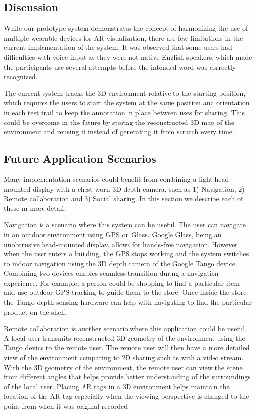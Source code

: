 \subsection{Discussion}

%
%
While our prototype  system demonstrates the concept of harmonizing the use of multiple wearable devices for AR visualization, there are few limitations in the current implementation of the system. It was observed that some users had difficulties with voice input as they were not native English speakers, which made the participants use several attempts before the intended word was correctly recognized.  

The current system tracks the 3D environment relative to the starting position, which requires the users to start the system at the same position and orientation in each test trail to keep the annotation in place between uses for sharing. This could be overcome in the future by storing the reconstructed 3D map of the environment and reusing it instead of generating it from scratch every time. 

\subsection{Future Application Scenarios}

Many implementation scenarios could benefit from combining a light head-mounted display with a chest worn 3D depth camera,  such as 1) Navigation, 2) Remote collaboration and 3) Social sharing. In this section we describe each of these in more detail.

Navigation is a scenario where this system can be useful. The user can navigate in an outdoor environment using GPS on Glass. Google Glass, being an unobtrusive head-mounted display, allows for hands-free navigation. However when the user enters a building, the GPS stops working and the system switches to indoor navigation using the 3D depth camera of the Google Tango device. Combining two devices enables seamless transition during a navigation experience. For example, a person could be shopping to find a particular item and use outdoor GPS tracking to guide them to the store. Once inside the store the Tango depth sensing hardware can help with navigating to find the particular product on the shelf.

Remote collaboration is another scenario where this application could be useful. A local user transmits reconstructed 3D geometry of the environment using the Tango device to the remote user. The remote user will then have a more detailed view of the environment comparing to 2D sharing such as with a video stream. With the 3D geometry of the environment, the remote user can view the scene from different angles that helps provide better understanding of the surroundings of the local user. Placing AR tags in a 3D environment helps maintain the location of the AR tag especially when the viewing perspective is changed to the point from when it was original recorded

